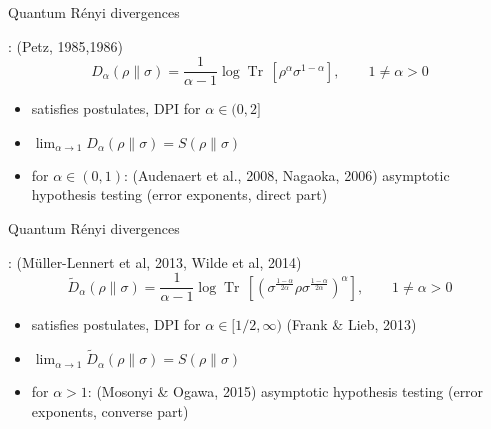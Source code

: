 \documentclass[mathserif]{beamer}
\newcommand{\<}{\langle}
\renewcommand{\>}{\rangle}
\newcommand{\Tr}{\operatorname{Tr}\,}
\begin{document}
\begin{frame}{Quantum R\'enyi divergences}

: {\small (Petz, 1985,1986)}
\[
D_\alpha(\rho\|\sigma)=\frac1{\alpha-1}\log\Tr\left[\rho^\alpha\sigma^{1-\alpha}\right], \qquad 1\ne
\alpha>0
\]
\begin{itemize}
\item satisfies postulates, DPI for $\alpha\in (0,2]$
\vskip 3mm
\item $\lim_{\alpha\to 1} D_\alpha(\rho\|\sigma)=S(\rho\|\sigma)$
\vskip 3mm
\item {} for $\alpha\in (0,1)$: {\small (Audenaert et
al., 2008, Nagaoka, 2006)}
\vskip 2mm
asymptotic hypothesis testing (error
exponents, direct part) 

\end{itemize}

\end{frame}


\begin{frame}{Quantum R\'enyi divergences}

: {\small (M\"uller-Lennert et al,
2013, Wilde et al, 2014)} 
\[
\tilde
D_\alpha(\rho\|\sigma)=\frac1{\alpha-1}\log\Tr\left[\left(\sigma^{\frac{1-\alpha}{2\alpha}}\rho\sigma^{\frac{1-\alpha}{2\alpha}}\right)^\alpha\right],\qquad
1\ne \alpha>0
\]
\begin{itemize}
\item satisfies postulates, DPI for $\alpha\in [1/2,\infty)$ {\small (Frank \& Lieb,
2013)}

\vskip 3mm
\item $\lim_{\alpha\to 1} \tilde D_\alpha(\rho\|\sigma)=S(\rho\|\sigma)$
\vskip 3mm
\item {} for $\alpha>1$: {\small (Mosonyi \& Ogawa,
2015)}
\vskip 2mm
asymptotic hypothesis testing (error
exponents, converse part) 

\end{itemize}

\end{frame}
\end{document}
